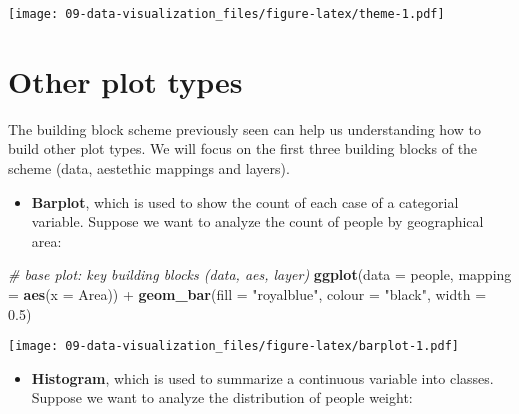\documentclass[]{book}
\newenvironment{Shaded}{\begin{snugshade}}{\end{snugshade}}
\newcommand{\KeywordTok}[1]{\textcolor[rgb]{0.13,0.29,0.53}{\textbf{{#1}}}}
\newcommand{\DataTypeTok}[1]{\textcolor[rgb]{0.13,0.29,0.53}{{#1}}}
\newcommand{\DecValTok}[1]{\textcolor[rgb]{0.00,0.00,0.81}{{#1}}}
\newcommand{\FloatTok}[1]{\textcolor[rgb]{0.00,0.00,0.81}{{#1}}}
\newcommand{\StringTok}[1]{\textcolor[rgb]{0.31,0.60,0.02}{{#1}}}
\newcommand{\CommentTok}[1]{\textcolor[rgb]{0.56,0.35,0.01}{\textit{{#1}}}}
\newcommand{\NormalTok}[1]{{#1}}
\providecommand{\tightlist}{%
  \setlength{\itemsep}{0pt}\setlength{\parskip}{0pt}}
\def\tightlist{}
\begin{document}
\texttt{[image: 09-data-visualization\_files/figure-latex/theme-1.pdf]}

\clearpage

\section{Other plot types}\label{other-plot-types}

The building block scheme previously seen can help us understanding how
to build other plot types. We will focus on the first three building
blocks of the scheme (data, aestethic mappings and layers).

\begin{itemize}
\tightlist
\item
  \textbf{Barplot}, which is used to show the count of each case of a
  categorial variable. Suppose we want to analyze the count of people by
  geographical area:
\end{itemize}

\begin{Shaded}
\begin{Highlighting}[]
\CommentTok{# base plot: key building blocks (data, aes, layer)}
\KeywordTok{ggplot}\NormalTok{(}\DataTypeTok{data =} \NormalTok{people, }\DataTypeTok{mapping =} \KeywordTok{aes}\NormalTok{(}\DataTypeTok{x =} \NormalTok{Area)) +}\StringTok{ }
\StringTok{  }\KeywordTok{geom_bar}\NormalTok{(}\DataTypeTok{fill =} \StringTok{"royalblue"}\NormalTok{, }\DataTypeTok{colour =} \StringTok{"black"}\NormalTok{, }\DataTypeTok{width =} \FloatTok{0.5}\NormalTok{)}
\end{Highlighting}
\end{Shaded}

\texttt{[image: 09-data-visualization\_files/figure-latex/barplot-1.pdf]}

\begin{itemize}
\tightlist
\item
  \textbf{Histogram}, which is used to summarize a continuous variable
  into classes. Suppose we want to analyze the distribution of people
  weight:
\end{itemize}

\begin{Shaded}
\end{Shaded}
\end{document}
